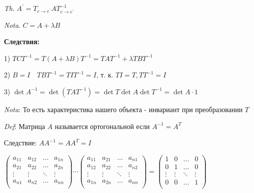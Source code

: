 \documentclass[12pt]{article}
\begin{document}
    \vspace{3mm}
\textit{Th}. $A^\prime = T_{e\to e^\prime} A T^{-1}_{e\to e^\prime}$

    \vspace{3mm}
\textit{Nota}. $C = A + \lambda B$

    \vspace{5mm}
    \textbf{
    Следствия:}

    1) $TCT^{-1} = T (A + \lambda B) T^{-1} = T A T^{-1} + \lambda T B T^{-1}$

    2) $B = I \quad T B T^{-1} = T I T^{-1} = I$, т. к. $TI = T, T T^{-1} = I$

    3) $\det A^{-1} = \det (T A T^{-1}) = \det T \det A \det T^{-1} = \det A \cdot 1$

    \vspace{3mm}
\textit{Nota}: То есть характеристика нашего объекта - инвариант при преобразовании $T$

    \vspace{3mm}
\textit{Def}: Матрица $A$ называется ортогональной если $A^{-1} = A^T$

    Следствие: $AA^{-1} = AA^T = I$

    $\begin{pmatrix}
         a_{11} & a_{12} & \dots & a_{1n} \\
         a_{21} & a_{22} & \dots & a_{2n} \\
         \vdots & \vdots & \ddots & \vdots \\
         a_{n1} & a_{n2} & \dots & a_{nn} \\
    \end{pmatrix} \cdots \begin{pmatrix}
         a_{11} & a_{21} & \dots & a_{n1} \\
         a_{12} & a_{22} & \dots & a_{n2} \\
         \vdots & \vdots & \ddots & \vdots \\
         a_{1n} & a_{2n} & \dots & a_{nn} \\
    \end{pmatrix} = \begin{pmatrix}
         1 & 0 & \dots & 0 \\
         0 & 1 & \dots & 0 \\
         \vdots & \vdots & \ddots & \vdots \\
         0 & 0 & \dots & 1 \\
    \end{pmatrix}$
\end{document}
